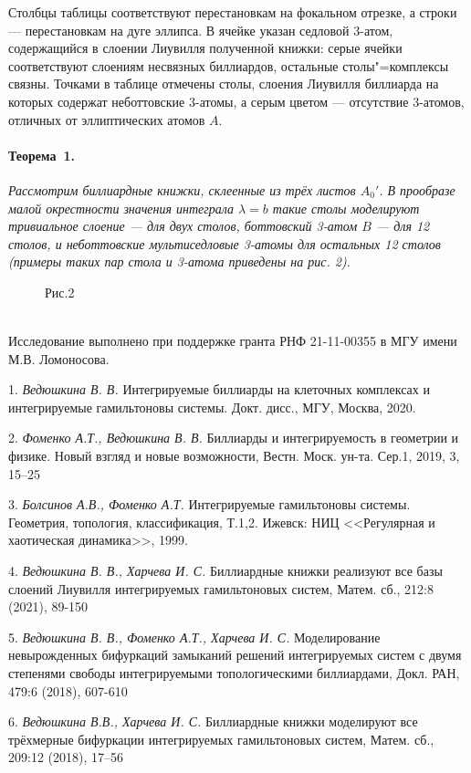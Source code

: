 Столбцы таблицы соответствуют перестановкам на фокальном отрезке, а строки --- перестановкам на дуге эллипса. В ячейке указан седловой 3-атом, содержащийся в слоении Лиувилля полученной книжки: серые ячейки соответствуют слоениям несвязных биллиардов, остальные столы"=комплексы связны. Точками в таблице отмечены столы, слоения Лиувилля биллиарда на которых содержат неботтовские 3-атомы, а серым цветом --- отсутствие 3-атомов, отличных от эллиптических атомов $A$.\\

 \vspace*{-0.6cm}
\paragraph{Теорема~1.}
{\it
	Рассмотрим биллиардные книжки, склеенные из трёх листов $A_0'$. В прообразе малой окрестности значения интеграла $\lambda=b$ такие столы моделируют тривиальное слоение — для двух столов, боттовский 3-атом $B$ — для 12 столов, и неботтовские мультиседловые 3-атомы для остальных 12 столов (примеры таких пар стола и 3-атома приведены на рис. 2).
}
\vspace*{-0.5cm}
\begin{figure}[h!]
\begin{minipage}[h!]{0.49\linewidth}
\end{minipage}
\begin{minipage}[h!]{0.49\linewidth}
\end{minipage}
\begin{center}
Рис.2
\end{center}
\end{figure}\\

\vspace*{-0.8cm}
Исследование выполнено при поддержке гранта РНФ 21-11-00355 в МГУ имени М.В. Ломоносова.

\litlist


1. {\it Ведюшкина В. В.}
 Интегрируемые биллиарды на клеточных комплексах и интегрируемые гамильтоновы системы. Докт. дисс., МГУ, Москва, 2020.

2. {\it Фоменко А.Т., Ведюшкина В. В.}
 Биллиарды и интегрируемость в геометрии и физике. Новый взгляд и новые возможности, Вестн. Моск. ун-та. Сер.1, 2019, 3, 15–25

3.  {\it Болсинов А.В., Фоменко А.Т.}
 Интегрируемые гамильтоновы системы. Геометрия, топология, классификация, Т.1,2. Ижевск: НИЦ <<Регулярная и хаотическая динамика>>, 1999.

4. {\it Ведюшкина В. В., Харчева И. С.}
 Биллиардные книжки реализуют все базы слоений Лиувилля интегрируемых гамильтоновых систем, Матем. сб., 212:8 (2021),  89-150

5. {\it Ведюшкина В. В., Фоменко А.Т., Харчева И. С.}
 Моделирование невырожденных бифуркаций замыканий решений интегрируемых систем с двумя степенями свободы интегрируемыми топологическими биллиардами, Докл. РАН, 479:6 (2018), 607-610

 6. {\it Ведюшкина В.В., Харчева И. С.}
 Биллиардные книжки моделируют все трёхмерные бифуркации интегрируемых гамильтоновых систем, Матем. сб., 209:12 (2018), 17–56
